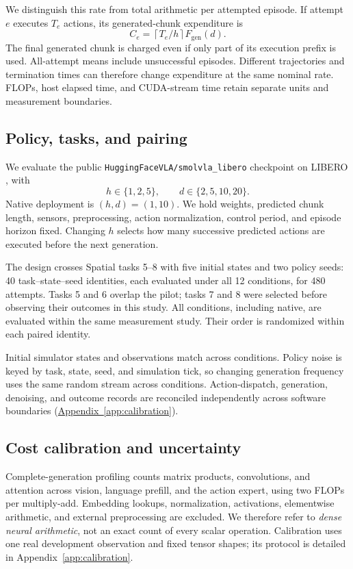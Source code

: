 \documentclass{article}
\begin{document}
We distinguish this rate from total arithmetic per attempted episode. If attempt
$e$ executes $T_e$ actions, its generated-chunk expenditure is
\begin{equation}
 C_e=\left\lceil T_e/h\right\rceil F_{\mathrm{gen}}(d).
 \label{eq:episode-cost}
\end{equation}
The final generated chunk is charged even if only part of its execution prefix
is used. All-attempt means include unsuccessful episodes. Different trajectories
and termination times can therefore change expenditure at the same nominal rate.
FLOPs, host elapsed time, and CUDA-stream time retain separate units and
measurement boundaries.

\subsection{Policy, tasks, and pairing}

We evaluate the public \texttt{HuggingFaceVLA/smolvla\_libero} checkpoint on LIBERO
\cite{libero}, with
\[
 h\in\{1,2,5\}, \qquad d\in\{2,5,10,20\}.
\]
Native deployment is $(h,d)=(1,10)$. We hold weights, predicted chunk length,
sensors, preprocessing, action normalization, control period, and episode
horizon fixed. Changing $h$ selects how many successive predicted actions are
executed before the next generation.

The design crosses Spatial tasks 5--8 with five initial states and two policy
seeds: 40 task--state--seed identities, each evaluated under all 12 conditions,
for 480 attempts. Tasks 5 and 6 overlap the pilot; tasks 7 and 8 were selected
before observing their outcomes in this study. All conditions, including native,
are evaluated within the same measurement study. Their order is randomized
within each paired identity.

Initial simulator states and observations match across conditions. Policy noise
is keyed by task, state, seed, and simulation tick, so changing generation
frequency uses the same random stream across conditions. Action-dispatch,
generation, denoising, and outcome records are reconciled independently across
software boundaries (\hyperref[app:verification]{Appendix~\ref{app:calibration}}).

\subsection{Cost calibration and uncertainty}

Complete-generation profiling counts matrix products, convolutions, and
attention across vision, language prefill, and the action expert, using two
FLOPs per multiply-add. Embedding lookups, normalization, activations,
elementwise arithmetic, and external preprocessing are excluded. We therefore
refer to \emph{dense neural arithmetic}, not an exact count of every scalar
operation. Calibration uses one real development observation and fixed tensor
shapes; its protocol is detailed in Appendix~\ref{app:calibration}.
\end{document}
